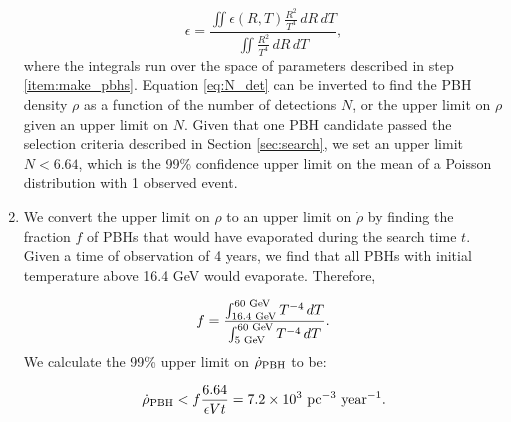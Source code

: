 \begin{enumerate}
\noindent
\begin{equation}
\epsilon = \frac{\iint \epsilon (R, T) \frac{R^2}{T^4} \,dR\,dT }{\iint \frac{R^2}{T^4}\,dR\,dT },
\end{equation}
where the integrals run over the space of parameters described in step \ref{item:make_pbhs}. 
Equation \ref{eq:N_det} can be inverted to find the PBH density $\rho$ as a function of the number of detections $N$, or the upper limit on $\rho$ given an upper limit on $N$. Given that one PBH candidate passed the selection criteria described in Section \ref{sec:search}, we set an upper limit $N < 6.64$, 
which is the 99\% confidence upper limit on the mean of a Poisson distribution with 1 observed event.

\item
\label{item:limit}
We convert the upper limit on $\rho$ to an upper limit on $\dot{\rho}$ by finding the fraction $f$ of PBHs that would have evaporated during the search time 
$t$. 
Given a time of observation of 4 years, we find that all PBHs with initial temperature above 16.4 GeV would evaporate. Therefore,

\noindent
\begin{equation}
f = \frac{\int_{\textup{16.4 GeV}}^{\textup{60 GeV}} T^{-4} \,dT}{\int_{\textup{5 GeV}}^{\textup{60 GeV}} T^{-4} \,dT}.
\end{equation}
We calculate the 99\% upper limit on $\dot{\rho}_{\rm PBH}$ to be:

\noindent
\begin{equation}
\dot{\rho}_{\rm PBH} < f\frac{6.64}{\epsilon V t} = 7.2 \times 10^3 \textup{ pc}^{-3} \textup{ year}^{-1}.
\end{equation}


\end{enumerate}
